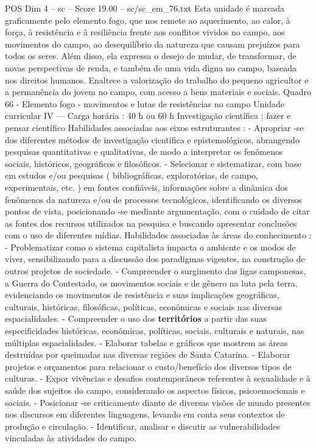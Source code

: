 \begin{textsample}{POS Dim 4 – sc – Score 19.00 – sc/sc\_em\_76.txt}
Esta unidade é marcada graficamente pelo elemento fogo, que nos remete ao aquecimento, ao calor, à força, à resistência e à resiliência frente aos conflitos vividos no campo, aos movimentos do campo, ao desequilíbrio da natureza que causam prejuízos para todos os seres.
Além disso, ela expressa o desejo de mudar, de transformar, de novas perspectivas de renda, e também de uma vida digna no campo, baseada nos direitos humanos.
Enaltece a valorização do trabalho do pequeno agricultor e a permanência do jovem no campo, com acesso a bens materiais e sociais.
Quadro 66 - Elemento fogo - movimentos e lutas de resistências no campo Unidade curricular IV — Carga horária : 40 h ou 60 h Investigação científica : fazer e pensar científico Habilidades associadas aos eixos estruturantes : - Apropriar -se dos diferentes métodos de investigação científica e epistemológicos, abrangendo pesquisas quantitativas e qualitativas, de modo a interpretar os fenômenos sociais, históricos, geográficos e filosóficos. - Selecionar e sistematizar, com base em estudos e/ou pesquisas ( bibliográficas, exploratórias, de campo, experimentais, etc. ) em fontes confiáveis, informações sobre a dinâmica dos fenômenos da natureza e/ou de processos tecnológicos, identificando os diversos pontos de vista, posicionando -se mediante argumentação, com o cuidado de citar as fontes dos recursos utilizados na pesquisa e buscando apresentar conclusões com o uso de diferentes mídias.
Habilidades associadas às áreas do conhecimento : - Problematizar como o sistema capitalista impacta o ambiente e os modos de viver, sensibilizando para a discussão dos paradigmas vigentes, na construção de outros projetos de sociedade. - Compreender o surgimento das ligas camponesas, a Guerra do Contestado, os movimentos sociais e de gênero na luta pela terra, evidenciando os movimentos de resistência e suas implicações geográficas, culturais, históricas, filosóficas, políticas, econômicas e sociais nas diversas espacialidades. - Compreender o uso dos \textbf{territórios} a partir das suas especificidades históricas, econômicas, políticas, sociais, culturais e naturais, nas múltiplas espacialidades. - Elaborar tabelas e gráficos que mostrem as áreas destruídas por queimadas nas diversas regiões de Santa Catarina. - Elaborar projetos e orçamentos para relacionar o custo/benefício dos diversos tipos de culturas. - Expor vivências e desafios contemporâneos referentes à sexualidade e à saúde dos sujeitos do campo, considerando os aspectos físicos, psicoemocionais e sociais. - Posicionar -se criticamente diante de diversas visões de mundo presentes nos discursos em diferentes linguagens, levando em conta seus contextos de produção e circulação. - Identificar, analisar e discutir as vulnerabilidades vinculadas às atividades do campo.

\end{textsample}
